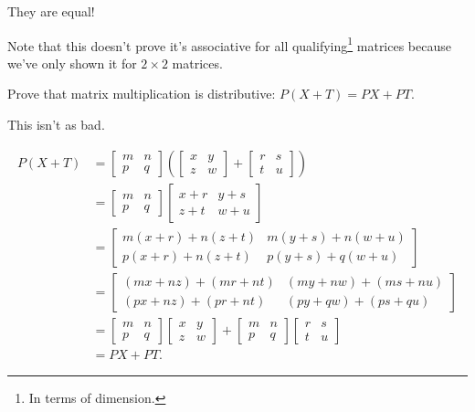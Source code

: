 \documentclass[../key.tex]{subfiles}
\begin{document}
They are equal!

Note that this doesn't prove it's associative for all qualifying\footnote{In terms of dimension.} matrices because we've only shown it for $2\times 2$ matrices.

\begin{outer_problem}
\item Prove that matrix multiplication is distributive: $P(X+T)=PX+PT$.
\end{outer_problem}

This isn't as bad.

\begin{align*}
P(X+T) &= \begin{bmatrix} m & n \\ p & q \end{bmatrix}\left(\begin{bmatrix} x & y \\ z & w \end{bmatrix} + \begin{bmatrix} r & s \\ t & u \end{bmatrix}\right) \\
&= \begin{bmatrix} m & n \\ p & q \end{bmatrix}\begin{bmatrix} x + r & y + s \\ z + t & w + u\end{bmatrix} \\
&= \begin{bmatrix}m(x+r) + n(z+t) & m(y+s) + n(w+u) \\ p(x+r) + n(z+t) & p(y+s) + q(w+u) \end{bmatrix} \\
&= \begin{bmatrix}(mx+nz) + (mr+nt) & (my+nw) + (ms+nu) \\ (px+nz) + (pr+nt) & (py+qw) + (ps+qu)\end{bmatrix} \\
&= \begin{bmatrix}m & n \\ p & q \end{bmatrix} \begin{bmatrix}x & y \\ z & w \end{bmatrix} + \begin{bmatrix}m & n \\ p & q \end{bmatrix} \begin{bmatrix} r & s \\ t & u \end{bmatrix} \\
&= PX + PT.
\end{align*}
\end{document}
